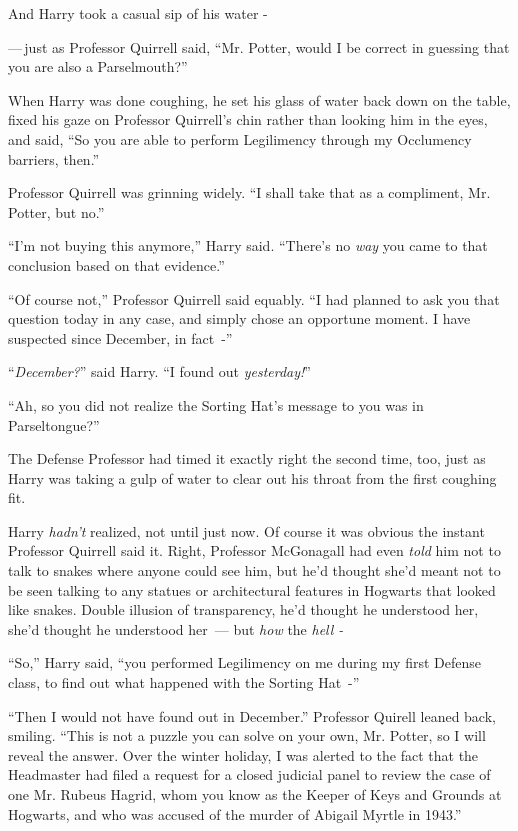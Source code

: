 And Harry took a casual sip of his water -

---\,just as Professor Quirrell said, ``Mr. Potter, would I be correct in guessing that you are also a Parselmouth?''

When Harry was done coughing, he set his glass of water back down on the table, fixed his gaze on Professor Quirrell's chin rather than looking him in the eyes, and said, ``So you are able to perform Legilimency through my Occlumency barriers, then.''

Professor Quirrell was grinning widely. ``I shall take that as a compliment, Mr. Potter, but no.''

``I'm not buying this anymore,'' Harry said. ``There's no \emph{way} you came to that conclusion based on that evidence.''

``Of course not,'' Professor Quirrell said equably. ``I had planned to ask you that question today in any case, and simply chose an opportune moment. I have suspected since December, in fact~-''

``\emph{December?}'' said Harry. ``I found out \emph{yesterday!}''

``Ah, so you did not realize the Sorting Hat's message to you was in Parseltongue?''

The Defense Professor had timed it exactly right the second time, too, just as Harry was taking a gulp of water to clear out his throat from the first coughing fit.

Harry \emph{hadn't} realized, not until just now. Of course it was obvious the instant Professor Quirrell said it. Right, Professor McGonagall had even \emph{told} him not to talk to snakes where anyone could see him, but he'd thought she'd meant not to be seen talking to any statues or architectural features in Hogwarts that looked like snakes. Double illusion of transparency, he'd thought he understood her, she'd thought he understood her~--- but \emph{how} the \emph{hell -}

``So,'' Harry said, ``you performed Legilimency on me during my first Defense class, to find out what happened with the Sorting Hat~-''

``Then I would not have found out in December.'' Professor Quirell leaned back, smiling. ``This is not a puzzle you can solve on your own, Mr. Potter, so I will reveal the answer. Over the winter holiday, I was alerted to the fact that the Headmaster had filed a request for a closed judicial panel to review the case of one Mr. Rubeus Hagrid, whom you know as the Keeper of Keys and Grounds at Hogwarts, and who was accused of the murder of Abigail Myrtle in 1943.''

